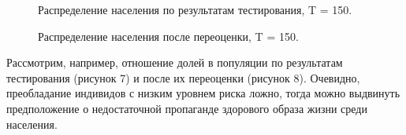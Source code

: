 \documentclass[a4paper]{report}
\begin{document}
	\begin{figure}[h!]
		\caption{Распределение населения по результатам тестирования, T = 150.}	
	\end{figure}
	
	\begin{figure}[h!]
		\caption{Распределение населения после переоценки, T = 150.}	
	\end{figure}

	\newpage
	
	Рассмотрим, например, отношение долей в популяции по результатам тестирования (рисунок 7) и после их переоценки (рисунок 8). Очевидно, преобладание индивидов с низким уровнем риска ложно, тогда можно выдвинуть предположение о недостаточной пропаганде здорового образа жизни среди населения.
\end{document}
